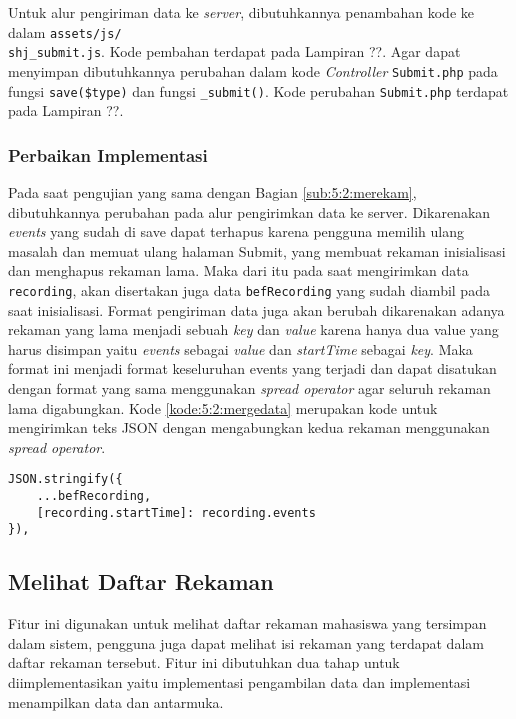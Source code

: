 Untuk alur pengiriman data ke \textit{server}, dibutuhkannya penambahan kode ke dalam \verb|assets/js/|\\\verb|shj_submit.js|. Kode pembahan terdapat pada Lampiran ??. Agar dapat menyimpan dibutuhkannya perubahan dalam kode \textit{Controller} \verb|Submit.php| pada fungsi \verb|save($type)| dan fungsi \verb|_submit()|. Kode perubahan \verb|Submit.php| terdapat pada Lampiran ??.

\subsubsection{Perbaikan Implementasi}

Pada saat pengujian yang sama dengan Bagian \ref{sub:5:2:merekam}, dibutuhkannya perubahan pada alur pengirimkan data ke server. Dikarenakan \textit{events} yang sudah di save dapat terhapus karena pengguna memilih ulang masalah dan memuat ulang halaman Submit, yang membuat rekaman inisialisasi dan menghapus rekaman lama. Maka dari itu pada saat mengirimkan data \verb|recording|, akan disertakan juga data \verb|befRecording| yang sudah diambil pada saat inisialisasi. Format pengiriman data juga akan berubah dikarenakan adanya rekaman yang lama menjadi sebuah \textit{key} dan \textit{value} karena hanya dua value yang harus disimpan yaitu \textit{events} sebagai \textit{value} dan \textit{startTime} sebagai \textit{key}. Maka format ini menjadi format keseluruhan events yang terjadi dan dapat disatukan dengan format yang sama menggunakan \textit{spread operator} agar seluruh rekaman lama digabungkan. Kode \ref{kode:5:2:mergedata} merupakan kode untuk mengirimkan teks JSON dengan mengabungkan kedua rekaman menggunakan \textit{spread operator}.

\begin{lstlisting}[caption={\textit{object callback function}}, label={kode:5:2:mergedata}]
JSON.stringify({
    ...befRecording,
    [recording.startTime]: recording.events
}),
\end{lstlisting}

\subsection{Melihat Daftar Rekaman}

Fitur ini digunakan untuk melihat daftar rekaman mahasiswa yang tersimpan dalam sistem, pengguna juga dapat melihat isi rekaman yang terdapat dalam daftar rekaman tersebut. Fitur ini dibutuhkan dua tahap untuk diimplementasikan yaitu implementasi pengambilan data dan implementasi menampilkan data dan antarmuka.

